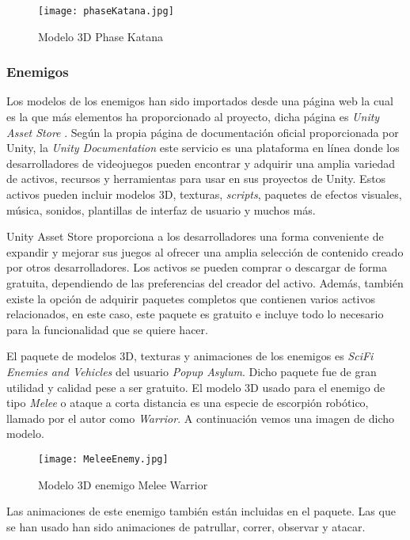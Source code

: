 \begin{figure}[H]
    \centering
    \texttt{[image: phaseKatana.jpg]}
    \caption{Modelo 3D Phase Katana}
\end{figure}

\subsubsection{Enemigos}

Los modelos de los enemigos han sido importados desde una página web la cual es la que más elementos ha proporcionado al proyecto, dicha página es \textit{Unity Asset Store} \cite{UnityAssetStore}. Según la propia página de documentación oficial proporcionada por Unity, la \textit{Unity Documentation} \cite{UnityDocumentation} este servicio es una plataforma en línea donde los desarrolladores de videojuegos pueden encontrar y adquirir una amplia variedad de activos, recursos y herramientas para usar en sus proyectos de Unity. Estos activos pueden incluir modelos 3D, texturas, \textit{scripts}, paquetes de efectos visuales, música, sonidos, plantillas de interfaz de usuario y muchos más.

Unity Asset Store proporciona a los desarrolladores una forma conveniente de expandir y mejorar sus juegos al ofrecer una amplia selección de contenido creado por otros desarrolladores. Los activos se pueden comprar o descargar de forma gratuita, dependiendo de las preferencias del creador del activo. Además, también existe la opción de adquirir paquetes completos que contienen varios activos relacionados, en este caso, este paquete es gratuito e incluye todo lo necesario para la funcionalidad que se quiere hacer.

El paquete de modelos 3D, texturas y animaciones de los enemigos es \textit{SciFi Enemies and Vehicles} del usuario \textit{Popup Asylum}. Dicho paquete fue de gran utilidad y calidad pese a ser gratuito. El modelo 3D usado para el enemigo de tipo \textit{Melee} o ataque a corta distancia es una especie de escorpión robótico, llamado por el autor como \textit{Warrior}. A continuación vemos una imagen de dicho modelo.

\begin{figure}[H]
    \centering
    \texttt{[image: MeleeEnemy.jpg]}
    \caption{Modelo 3D enemigo Melee Warrior}
\end{figure}

Las animaciones de este enemigo también están incluidas en el paquete. Las que se han usado han sido animaciones de patrullar, correr, observar y atacar.

